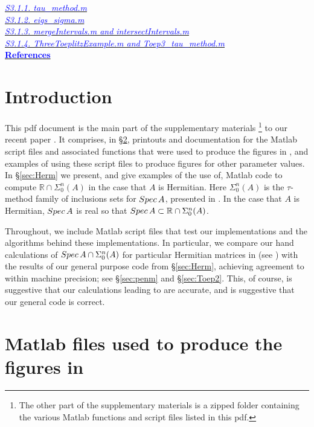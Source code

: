 \documentclass[preprint,1p,11pt]{elsarticle}
\newcommand{\bl}[1]{\textcolor{blue}{#1}}   %
\newcommand\R{{\mathbb R}}
\newcommand\Spec{{\rm Spec}\,}  %
\numberwithin{equation}{section}   %
\numberwithin{figure}{section}  %
\renewcommand{\thefootnote}{\arabic{footnote}}
\newcommand{\symbolfootnote}[1]{\begingroup
\renewcommand{\thefootnote}{\fnsymbol{footnote}}\footnote{#1}\endgroup}
\begin{document}
\hspace*{6ex} \hyperref[code:tm]{\bl{\it S3.1.1. tau\_method.m}}\\
\hspace*{6ex} \hyperref[code:es]{\bl{\it S3.1.2. eigs\_sigma.m}}\\
\hspace*{6ex} \hyperref[code:int]{\bl{\it S3.1.3. mergeIntervals.m and intersectIntervals.m}}\\
\hspace*{6ex} \hyperref[code:Toep3]{\bl{\it S3.1.4. ThreeToeplitzExample.m and Toep3\_tau\_method.m}}\\
\hyperref[sec:biblios]{\bl{\bf References}}

\section{Introduction} \label{sec:intros}

This pdf document is the main part of the supplementary materials\symbolfootnote{The other part of the supplementary materials is a zipped folder containing the various Matlab functions and script files listed in this pdf.} to our recent paper \cite{CWL}. It comprises, in \S\ref{sec:script}, printouts and documentation for the Matlab script files and associated functions that were used to produce the figures in \cite{CWL}, and examples of using these script files to produce figures for other parameter values. In \S\ref{sec:Herm} we present, and give examples of the use of, Matlab code to compute $\R\cap \Sigma_0^n(A)$ in the case that $A$ is Hermitian.  Here $\Sigma_0^n(A)$ is the $\tau$-method family of inclusions sets for $\Spec A$, presented in \cite[\S1.1]{CWL}. In the case that  $A$ is Hermitian, $\Spec A$ is real so that $\Spec A\subset \R\cap \Sigma_0^n(A)$. 

Throughout, we include Matlab script files that test our implementations and the algorithms behind these implementations. In particular, we compare our hand calculations of $\Spec A\cap \Sigma_0^n(A)$ for particular Hermitian matrices in \cite{CWL} (see \cite[(5.40), (5.47)]{CWL}) with the results of our general purpose code from \S\ref{sec:Herm}, achieving agreement to within machine precision; see \S\ref{sec:penm} and \S\ref{sec:Toep2}. This, of course, is suggestive that our calculations leading to  \cite[(5.40), (5.47)]{CWL} are accurate, and is suggestive that our general code is correct.  


\section{Matlab files used to produce the figures in \cite{CWL}} \label{sec:script}
\end{document}
